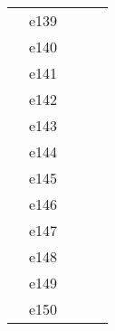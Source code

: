 \documentclass[10pt,letterpaper]{article}
\begin{document}
\begin{center}
\begin{tabular}{ |c|c|c|c|c|}
        & e139  &                &                &      \\
        & e140  &                &                &      \\
        & e141  &                &                &      \\
        & e142  &                &                &      \\
        & e143  &                &                &      \\
        & e144  &                &                &      \\
        & e145  &                &                &      \\
        & e146  &                &                &      \\
        & e147  &                &                &      \\
        & e148  &                &                &      \\
        & e149  &                &                &      \\
        & e150  &                &                &      \\

        \hline
        \end{tabular}
        \end{center}
\end{document}
